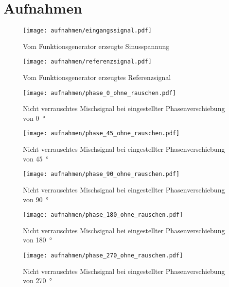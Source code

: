 \section{Aufnahmen}

\begin{figure}
  \centering
  \label{fig:anfangssignal_ohne_rausch}
  \texttt{[image: aufnahmen/eingangssignal.pdf]}
  \caption{Vom Funktionsgenerator erzeugte Sinusspannung}
\end{figure}

\begin{figure}
  \centering
  \label{fig:referenzsignal_ohne_rausch}
  \texttt{[image: aufnahmen/referenzsignal.pdf]}
  \caption{Vom Funktionsgenerator erzeugtes Referenzsignal}
\end{figure}


\begin{figure}
  \centering
  \label{fig:phase_0_nicht_verrauscht}
  \texttt{[image: aufnahmen/phase\_0\_ohne\_rauschen.pdf]}
  \caption{Nicht verrauschtes Mischsignal bei eingestellter
    Phasenverschiebung von \SI{0}{\degree}}
\end{figure}


\begin{figure}
  \centering
  \label{fig:phase_45_nicht_verrauscht}
  \texttt{[image: aufnahmen/phase\_45\_ohne\_rauschen.pdf]}
  \caption{Nicht verrauschtes Mischsignal bei eingestellter
    Phasenverschiebung von \SI{45}{\degree}}
\end{figure}


\begin{figure}
  \centering
  \label{fig:phase_90_nicht_verrauscht}
  \texttt{[image: aufnahmen/phase\_90\_ohne\_rauschen.pdf]}
  \caption{Nicht verrauschtes Mischsignal bei eingestellter
    Phasenverschiebung von \SI{90}{\degree}}
\end{figure}


\begin{figure}
  \centering
  \label{fig:phase_180_nicht_verrauscht}
  \texttt{[image: aufnahmen/phase\_180\_ohne\_rauschen.pdf]}
  \caption{Nicht verrauschtes Mischsignal bei eingestellter
    Phasenverschiebung von \SI{180}{\degree}}
\end{figure}


\begin{figure}
  \centering
  \label{fig:phase_270_nicht_verrauscht}
  \texttt{[image: aufnahmen/phase\_270\_ohne\_rauschen.pdf]}
  \caption{Nicht verrauschtes Mischsignal bei eingestellter
    Phasenverschiebung von \SI{270}{\degree}}
\end{figure}


